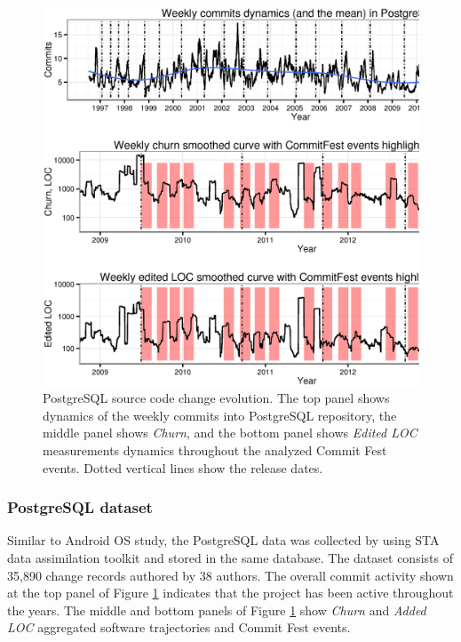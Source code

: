 \begin{figure}[t!]
   \centering
   \includegraphics[width=150mm]{figures/postgre_commits_dynamics.eps}
   \caption[PostgreSQL source code change evolution.]{PostgreSQL source code change evolution. The top panel shows dynamics of the weekly commits into PostgreSQL repository, the middle panel shows \textit{Churn}, and the bottom panel shows \textit{Edited LOC} measurements dynamics throughout the analyzed Commit Fest events. Dotted vertical lines show the release dates.}
   \label{fig:postgre_dynamics}
\end{figure}

\subsubsection{PostgreSQL dataset}
Similar to Android OS study, the PostgreSQL data was collected by using STA data assimilation toolkit and stored in the same database. The dataset consists of 35,890 change records authored by 38 authors. The overall commit activity shown at the top panel of Figure \ref{fig:postgre_dynamics} indicates that the project has been active throughout the years. The middle and bottom panels of Figure \ref{fig:postgre_dynamics} show \textit{Churn} and \textit{Added LOC} aggregated software trajectories and Commit Fest events.

